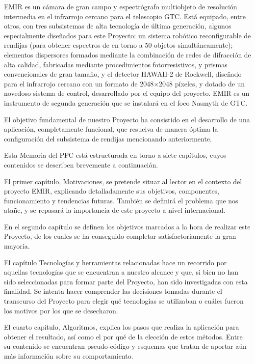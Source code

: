 EMIR es un cámara de gran campo y espectrógrafo multiobjeto de resolución
intermedia en el infrarrojo cercano para el telescopio GTC. Está equipado, entre
otros, con tres subsistemas de alta tecnología de última generación, algunos
especialmente diseñados para este Proyecto: un sistema robótico reconfigurable
de rendijas (para obtener espectros de en torno a 50 objetos simultáneamente);
elementos dispersores formados mediante la combinación de redes de difracción de
alta calidad, fabricadas mediante procedimientos fotorresistivos, y prismas
convencionales de gran tamaño, y el detector HAWAII-2 de Rockwell, diseñado para
el infrarrojo cercano con un formato de 2048$\times$2048 píxeles, y dotado de un
novedoso sistema de control, desarrollado por el equipo del proyecto. EMIR es un
instrumento de segunda generación que se instalará en el foco Nasmyth de GTC.

El objetivo fundamental de nuestro Proyecto ha consistido en el desarrollo de
una aplicación, completamente funcional, que resuelva de manera óptima la
configuración del subsistema de rendijas mencionando anteriormente.

Esta Memoria del PFC está estructurada en torno a siete capítulos, cuyos
contenidos se describen brevemente a continuación.

El primer capítulo, Motivaciones, se pretende situar al lector en el contexto
del proyecto EMIR, explicando detalladamente sus objetivos, componentes,
funcionamiento y tendencias futuras. También se definirá el problema que nos
atañe, y se repasará la importancia de este proyecto a nivel internacional.

En el segundo capítulo se definen los objetivos marcados a la hora de realizar
este Proyecto, de los cuales se ha conseguido completar satisfactoriamente la
gran mayoría.

El capítulo Tecnologías y herramientas relacionadas hace un recorrido por
aquellas tecnologías que se encuentran a nuestro alcance y que, si bien no han
sido seleccionadas para formar parte del Proyecto, han sido investigadas con
esta finalidad. Se intenta hacer comprender las decisiones tomadas durante el
transcurso del Proyecto para elegir qué tecnologías se utilizaban o cuáles
fueron los motivos por los que se desecharon.

El cuarto capítulo, Algoritmos, explica los pasos que realiza la aplicación para
obtener el resultado, así como el por qué de la elección de estos métodos. Entre
su contenido se encuentran pseudo-código y esquemas que tratan de aportar aún más
información sobre su comportamiento.

